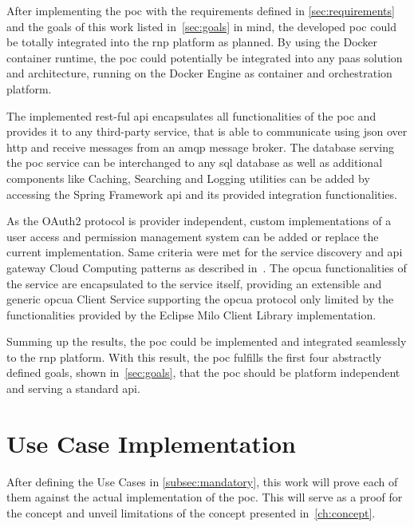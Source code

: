 \documentclass[
a4paper,
twoside,
headsepline,
cleardoublepage=empty,
parskip=half,
draft=false
]{scrbook}
\begin{document}
			After implementing the \gls{poc} with the requirements defined in \cref{sec:requirements} and the goals of this work listed in~\cref{sec:goals} in mind, the developed \gls{poc} could be totally integrated into the \gls{rnp} platform as planned. By using the Docker container runtime, the \gls{poc} could potentially be integrated into any \gls{paas} solution and architecture, running on the Docker Engine as container and orchestration platform.

			The implemented \gls{rest}-ful \gls{api} encapsulates all functionalities of the \gls{poc} and provides it to any third-party service, that is able to communicate using \gls{json} over \gls{http} and receive messages from an \gls{amqp} message broker. The database serving the \gls{poc} service can be interchanged to any \gls{sql} database as well as additional components like Caching, Searching and Logging utilities can be added by accessing the Spring Framework \gls{api} and its provided integration functionalities.

			As the OAuth2 protocol is provider independent, custom implementations of a user access and permission management system can be added or replace the current implementation. Same criteria were met for the service discovery and \gls{api} gateway Cloud Computing patterns as described in~\cite{leymann2011cloud}.
			The \gls{opcua} functionalities of the service are encapsulated to the service itself, providing an extensible and generic \gls{opcua} Client Service supporting the \gls{opcua} protocol only limited by the functionalities provided by the Eclipse Milo Client Library implementation.

			Summing up the results, the \gls{poc} could be implemented and integrated seamlessly to the \gls{rnp} platform. With this result, the \gls{poc} fulfills the first four abstractly defined goals, shown in~\cref{sec:goals}, that the \gls{poc} should be platform independent and serving a standard \gls{api}.

		\section{Use Case Implementation}\label{sec:use_cases_implementation}

			After defining the Use Cases in \cref{subsec:mandatory}, this work will prove each of them against the actual implementation of the \gls{poc}. This will serve as a proof for the concept and unveil limitations of the concept presented in~\cref{ch:concept}.
\end{document}
